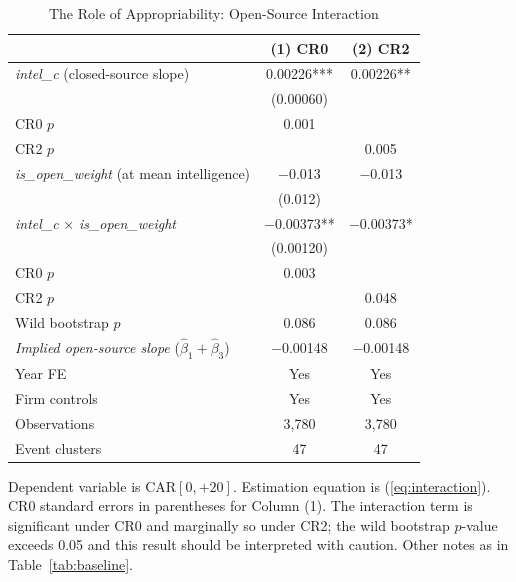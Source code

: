 \documentclass[12pt]{article}
\begin{document}
\begin{table}[htbp]
\centering
\caption{The Role of Appropriability: Open-Source Interaction}
\label{tab:interaction}
\begin{threeparttable}
\begin{tabular}{lcc}
\toprule
 & (1) CR0 & (2) CR2 \\
\midrule
\textit{intel\_c} (closed-source slope) & 0.00226*** & 0.00226** \\
 & (0.00060) & \\[2pt]
CR0 $p$ & 0.001 & \\
CR2 $p$ & & 0.005 \\[6pt]
\textit{is\_open\_weight} (at mean intelligence) & $-$0.013 & $-$0.013 \\
 & (0.012) & \\[6pt]
\textit{intel\_c} $\times$ \textit{is\_open\_weight} & $-$0.00373** & $-$0.00373* \\
 & (0.00120) & \\[2pt]
CR0 $p$ & 0.003 & \\
CR2 $p$ & & 0.048 \\
Wild bootstrap $p$ & 0.086 & 0.086 \\[6pt]
\textit{Implied open-source slope} ($\hat{\beta}_1 + \hat{\beta}_3$) & $-$0.00148 & $-$0.00148 \\[4pt]
\midrule
Year FE & Yes & Yes \\
Firm controls & Yes & Yes \\
Observations & 3,780 & 3,780 \\
Event clusters & 47 & 47 \\
\bottomrule
\end{tabular}
\begin{tablenotes}[flushleft]\footnotesize
\item Dependent variable is CAR$[0,{+}20]$. Estimation equation is
(\ref{eq:interaction}). CR0 standard errors in parentheses for Column (1).
The interaction term is significant under CR0 and marginally so under CR2;
the wild bootstrap $p$-value exceeds 0.05 and this result should be interpreted
with caution. Other notes as in Table~\ref{tab:baseline}.
\end{tablenotes}
\end{threeparttable}
\end{table}
\end{document}
